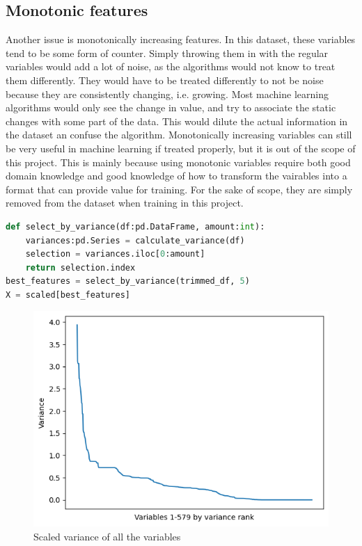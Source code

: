 \subsection{Monotonic features}
Another issue is monotonically increasing features. In this dataset, these variables tend to be some form of counter. Simply throwing them in with the regular variables would add a lot of noise, as the algorithms would not know to treat them differently.
They would have to be treated differently to not be noise because they are consistently changing, i.e. growing. Most machine learning algorithms would only see the change in value, and try to associate the static changes with some part of the data. This would dilute the actual information in the dataset an confuse the algorithm.
Monotonically increasing variables can still be very useful in machine learning if treated properly, but it is out of the scope of this project. 
This is mainly because using monotonic variables require both good domain knowledge and good knowledge of how to transform the vairables into a format that can provide value for training. 
For the sake of scope, they are simply removed from the dataset when training in this project.


\begin{lstlisting}[language=Python]
def select_by_variance(df:pd.DataFrame, amount:int):
    variances:pd.Series = calculate_variance(df)
    selection = variances.iloc[0:amount]
    return selection.index
best_features = select_by_variance(trimmed_df, 5)
X = scaled[best_features]
\end{lstlisting}



\begin{figure}[ht]
\centering 
\includegraphics[width=\columnwidth]{Figures/Graphs/Total_variance}
\caption{Scaled variance of all the variables}
\label{variance}
\end{figure}


